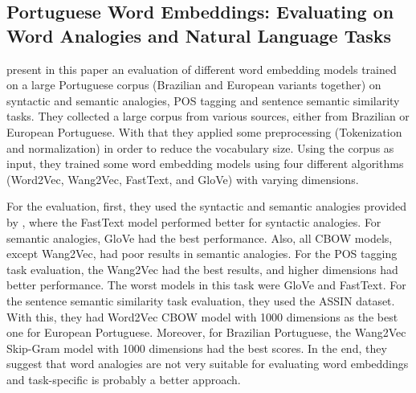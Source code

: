\subsection{Portuguese Word Embeddings: Evaluating on Word Analogies and Natural
Language Tasks}

 present in this paper an evaluation of different word embedding models trained on a large Portuguese corpus (Brazilian and European variants together) on syntactic and semantic analogies, POS tagging and sentence semantic similarity tasks.
They collected a large corpus from various sources, either from Brazilian or European Portuguese. With that they applied some preprocessing (Tokenization and normalization) in order to reduce the vocabulary size. Using the corpus as input, they trained some word embedding models using four different algorithms (Word2Vec, Wang2Vec, FastText, and GloVe) with varying dimensions.

For the evaluation, first, they used the syntactic and semantic analogies provided by , where the FastText model performed better for syntactic analogies. For semantic analogies, GloVe had the best performance. Also, all CBOW models, except Wang2Vec, had poor results in semantic analogies.
For the POS tagging task evaluation, the Wang2Vec had the best results, and higher dimensions had better performance. The worst models in this task were GloVe and FastText. 
For the sentence semantic similarity task evaluation, they used the ASSIN dataset. With this, they had Word2Vec CBOW model with 1000 dimensions as the best one for European Portuguese. Moreover, for Brazilian Portuguese, the Wang2Vec Skip-Gram model with 1000 dimensions had the best scores.
In the end, they suggest that word analogies are not very suitable for evaluating word embeddings and task-specific is probably a better approach.








